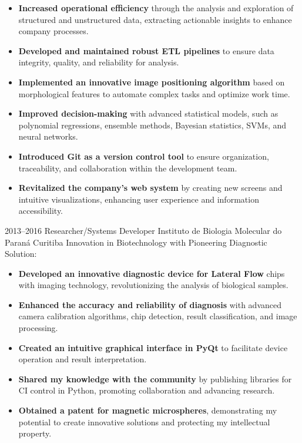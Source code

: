 \documentclass[11pt,a4paper,sans]{moderncv}        %
\begin{document}
\begin{itemize}%
  \item \textbf{Increased operational efficiency} through the analysis and exploration of structured and unstructured data, extracting actionable insights to enhance company processes.
  \item \textbf{Developed and maintained robust ETL pipelines} to ensure data integrity, quality, and reliability for analysis.
  \item \textbf{Implemented an innovative image positioning algorithm} based on morphological features to automate complex tasks and optimize work time.
  \item \textbf{Improved decision-making} with advanced statistical models, such as polynomial regressions, ensemble methods, Bayesian statistics, SVMs, and neural networks.
  \item \textbf{Introduced Git as a version control tool} to ensure organization, traceability, and collaboration within the development team.
  \item \textbf{Revitalized the company's web system} by creating new screens and intuitive visualizations, enhancing user experience and information accessibility.
\end{itemize}

\vspace{1em}
\cventry
{2013--2016}
{Researcher/Systems Developer}
{Instituto de Biologia Molecular do Paraná}
{Curitiba}{}
{Innovation in Biotechnology with Pioneering Diagnostic Solution:}

\begin{itemize}%
  \item \textbf{Developed an innovative diagnostic device for Lateral Flow} chips with imaging technology, revolutionizing the analysis of biological samples.
  \item \textbf{Enhanced the accuracy and reliability of diagnosis} with advanced camera calibration algorithms, chip detection, result classification, and image processing.
  \item \textbf{Created an intuitive graphical interface in PyQt} to facilitate device operation and result interpretation.
  \item \textbf{Shared my knowledge with the community} by publishing libraries for CI control in Python, promoting collaboration and advancing research.
  \item \textbf{Obtained a patent for magnetic microspheres}, demonstrating my potential to create innovative solutions and protecting my intellectual property.
\end{itemize}
\end{document}
